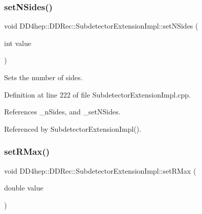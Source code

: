 \hypertarget{class_d_d4hep_1_1_d_d_rec_1_1_subdetector_extension_impl_a5cbc7835f1656dbb21ce4c9d3442a74b}{}\label{class_d_d4hep_1_1_d_d_rec_1_1_subdetector_extension_impl_a5cbc7835f1656dbb21ce4c9d3442a74b} 
\subsubsection{\texorpdfstring{set\+N\+Sides()}{setNSides()}}
{\footnotesize\ttfamily void D\+D4hep\+::\+D\+D\+Rec\+::\+Subdetector\+Extension\+Impl\+::set\+N\+Sides (\begin{DoxyParamCaption}\item[{int}]{value }\end{DoxyParamCaption})}



Sets the number of sides. 



Definition at line 222 of file Subdetector\+Extension\+Impl.\+cpp.



References \+\_\+n\+Sides, and \+\_\+set\+N\+Sides.



Referenced by Subdetector\+Extension\+Impl().

\hypertarget{class_d_d4hep_1_1_d_d_rec_1_1_subdetector_extension_impl_a3b92ffbf335b41a30b001f8bb09c985d}{}\label{class_d_d4hep_1_1_d_d_rec_1_1_subdetector_extension_impl_a3b92ffbf335b41a30b001f8bb09c985d} 
\subsubsection{\texorpdfstring{set\+R\+Max()}{setRMax()}}
{\footnotesize\ttfamily void D\+D4hep\+::\+D\+D\+Rec\+::\+Subdetector\+Extension\+Impl\+::set\+R\+Max (\begin{DoxyParamCaption}\item[{double}]{value }\end{DoxyParamCaption})}



